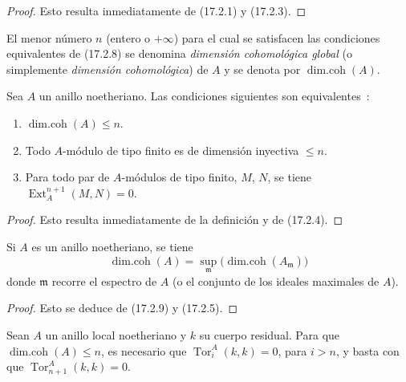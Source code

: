 \begin{proof}
Esto resulta inmediatamente de (17.2.1) y (17.2.3).
\end{proof}

El menor número $n$ (entero o $+\infty$) para el cual se satisfacen las condiciones
equivalentes de (17.2.8) se denomina \emph{dimensión cohomológica
global} (o simplemente \emph{dimensión cohomológica}) de $A$
y se denota por $\operatorname{dim.coh}(A)$.

\begin{proposition}[17.2.9]
\label{0.17.2.9-es}
Sea $A$ un anillo noetheriano. Las condiciones siguientes son equivalentes~:
\begin{enumerate}
  \item[\rm a)] $\operatorname{dim.coh}(A)\leq n$.
  \item[\rm b)] Todo $A$-módulo de tipo finito es de dimensión inyectiva
  $\leq n$.
  \item[\rm c)] Para todo par de $A$-módulos de tipo finito, $M$, $N$, se tiene
  $\operatorname{Ext}^{n+1}_A(M,N)=0$.
\end{enumerate}
\end{proposition}

\begin{proof}
Esto resulta inmediatamente de la definición y de (17.2.4).
\end{proof}

\begin{corollary}[17.2.10]
\label{0.17.2.10-es}
Si $A$ es un anillo noetheriano, se tiene
\begin{equation}
\label{0.17.2.10.1-es}
\tag{17.2.10.1}
  \operatorname{dim.coh}(A)
  =\sup_{\mathfrak{m}}
  \bigl(\operatorname{dim.coh}(A_{\mathfrak{m}})\bigr)
\end{equation}
donde $\mathfrak{m}$ recorre el espectro de $A$ \textup{(}o el conjunto de los ideales
maximales de $A$\textup{)}.
\end{corollary}

\begin{proof}
Esto se deduce de (17.2.9) y (17.2.5).
\end{proof}

\begin{proposition}[17.2.11]
\label{0.17.2.11-es}
Sean $A$ un anillo local noetheriano y $k$ su cuerpo residual. Para que
$\operatorname{dim.coh}(A)\leq n$, es necesario que
$\operatorname{Tor}^A_i(k,k)=0$, para $i>n$, y basta con que
$\operatorname{Tor}^A_{n+1}(k,k)=0$.
\end{proposition}

